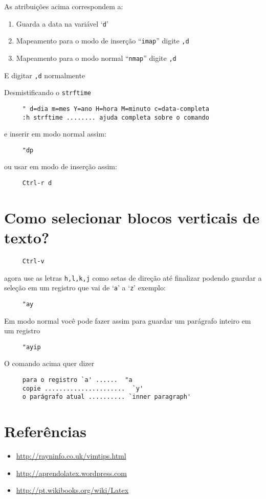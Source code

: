 As atribuições acima correspondem a:

\begin{enumerate}
 \item  Guarda a data na variável `{\tt d}'
 \item  Mapeamento para o modo de inserção ``{\tt imap}'' digite {\tt ,d}
 \item  Mapeamento para o modo normal ``{\tt nmap}'' digite {\tt ,d}
\end{enumerate}

E digitar {\tt ,d} normalmente

Desmistificando o {\tt strftime}
\begin{verbatim}
     " d=dia m=mes Y=ano H=hora M=minuto c=data-completa
     :h strftime ........ ajuda completa sobre o comando
\end{verbatim}

e inserir em modo normal assim:

\begin{verbatim}
     "dp
\end{verbatim}

ou usar em modo de inserção assim:

\begin{verbatim}
     Ctrl-r d
\end{verbatim}

\section{Como selecionar blocos verticais de texto?}
\label{Como selecionar blocos verticais de texto?}

\begin{verbatim}
     Ctrl-v
\end{verbatim}

agora use as letras {\tt h,l,k,j} como setas de direção até finalizar
podendo guardar a seleção em um registro que vai de `{\tt a}' a `{\tt z}' exemplo:

\begin{verbatim}
     "ay
\end{verbatim}

Em modo normal você pode fazer assim para guardar um parágrafo inteiro em um registro

\begin{verbatim}
     "ayip
\end{verbatim}

O comando acima quer dizer

\begin{verbatim}
     para o registro `a' ......  "a
     copie ......................  `y'
     o parágrafo atual .......... `inner paragraph'
\end{verbatim}

\section{Referências}
\label{Referências}

\begin{itemize}
   \item \url{http://rayninfo.co.uk/vimtips.html}
   \item \url{http://aprendolatex.wordpress.com}
   \item \url{http://pt.wikibooks.org/wiki/Latex}
\end{itemize}
